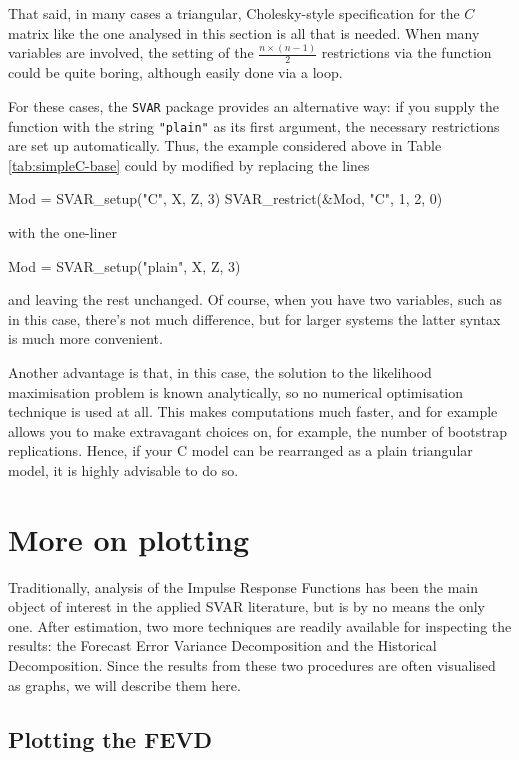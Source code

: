 \documentclass[a4paper,10pt]{article}
\newcommand{\dtk}[1]{\texttt{\detokenize{#1}}}
\begin{document}
That said, in many cases a triangular, Cholesky-style specification
for the $C$ matrix like the one analysed in this section is all that
is needed. When many variables are involved, the setting of the
$\frac{n \times (n-1)}{2}$ restrictions via the
\dtk{SVAR_restrict} function could be quite boring, although
easily done via a loop.

For these cases, the \texttt{SVAR} package provides an alternative
way: if you supply the \dtk{SVAR_setup} function with the string
\texttt{"plain"} as its first argument, the necessary restrictions are
set up automatically. Thus, the example considered above in Table
\ref{tab:simpleC-base} could by modified by replacing the lines
\begin{code}
Mod = SVAR_setup("C", X, Z, 3)
SVAR_restrict(&Mod, "C", 1, 2, 0)
\end{code}
with the one-liner
\begin{code}
Mod = SVAR_setup("plain", X, Z, 3)
\end{code}
and leaving the rest unchanged. Of course, when you have two
variables, such as in this case, there's not much difference, but for
larger systems the latter syntax is much more convenient.

Another advantage is that, in this case, the solution to the
likelihood maximisation problem is known analytically, so no numerical
optimisation technique is used at all. This makes computations much
faster, and for example allows you to make extravagant choices on, for
example, the number of bootstrap replications. Hence, if your C model
can be rearranged as a plain triangular model, it is highly advisable
to do so.

\section{More on plotting}
\label{sec:moreplots}

Traditionally, analysis of the Impulse Response Functions has been the
main object of interest in the applied SVAR literature, but is by no
means the only one.  After estimation, two more techniques are readily
available for inspecting the results: the Forecast Error Variance
Decomposition and the Historical Decomposition. Since the results from
these two procedures are often visualised as graphs, we will describe
them here.

\subsection{Plotting the FEVD}
\label{sec:fevdplots}
\end{document}
